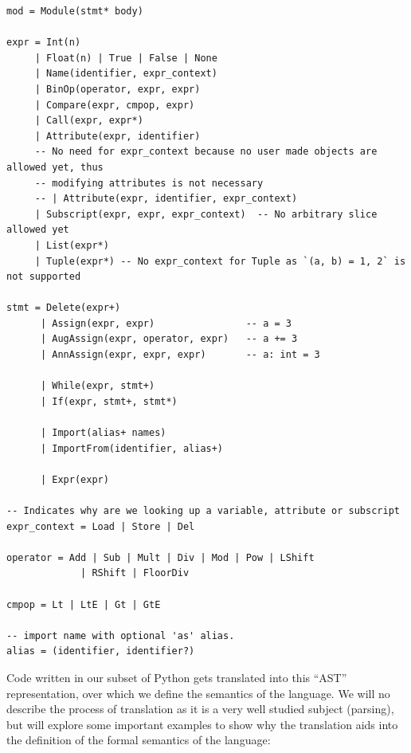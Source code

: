 \documentclass[
11pt, %
english, %
singlespacing, %
headsepline, %
]{MastersDoctoralThesis} %
\begin{document}
\begin{verbatim}
mod = Module(stmt* body)

expr = Int(n)
     | Float(n) | True | False | None
     | Name(identifier, expr_context)
     | BinOp(operator, expr, expr)
     | Compare(expr, cmpop, expr)
     | Call(expr, expr*)
     | Attribute(expr, identifier)
     -- No need for expr_context because no user made objects are allowed yet, thus
     -- modifying attributes is not necessary
     -- | Attribute(expr, identifier, expr_context)
     | Subscript(expr, expr, expr_context)  -- No arbitrary slice allowed yet
     | List(expr*)
     | Tuple(expr*) -- No expr_context for Tuple as `(a, b) = 1, 2` is not supported

stmt = Delete(expr+)
      | Assign(expr, expr)                -- a = 3
      | AugAssign(expr, operator, expr)   -- a += 3
      | AnnAssign(expr, expr, expr)       -- a: int = 3

      | While(expr, stmt+)
      | If(expr, stmt+, stmt*)

      | Import(alias+ names)
      | ImportFrom(identifier, alias+)

      | Expr(expr)

-- Indicates why are we looking up a variable, attribute or subscript
expr_context = Load | Store | Del

operator = Add | Sub | Mult | Div | Mod | Pow | LShift
             | RShift | FloorDiv

cmpop = Lt | LtE | Gt | GtE

-- import name with optional 'as' alias.
alias = (identifier, identifier?)
\end{verbatim}

Code written in our subset of Python gets translated into this
\enquote{AST} representation, over which we define the semantics of the
language. We will no describe the process of translation as it is a very
well studied subject (parsing), but will explore some important examples
to show why the translation aids into the definition of the formal
semantics of the language:
\end{document}
